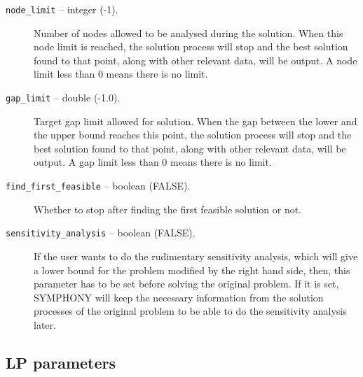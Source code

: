 \begin{description}
\item[{\tt node\_limit} -- integer (-1).]
Number of nodes allowed to be analysed during the solution. When this
node limit is reached, the solution process will stop and the best
solution found to that point, along with other relevant data, will be
output. A node limit less than 0 means there is no limit. 

\item[{\tt gap\_limit} -- double (-1.0).]
Target gap limit allowed for solution. When the gap between the lower and 
the upper bound reaches this point, the solution process will stop and the 
best solution found to that point, along with other relevant data, will be
output. A gap limit less than 0 means there is no limit.

\item[{\tt find\_first\_feasible} -- boolean (FALSE).]
Whether to stop after finding the first feasible solution or not. 

\item[{\tt sensitivity\_analysis} -- boolean (FALSE).]
If the user wants to do the rudimentary sensitivity analysis, which will 
give a lower bound for the problem modified by the right hand side, then, 
this parameter has to be set before solving the original problem. If it 
is set, SYMPHONY will keep the necessary information from the solution 
processes of the original problem to be able to do the sensitivity analysis 
later.  

\end{description}

\subsection{LP parameters}

